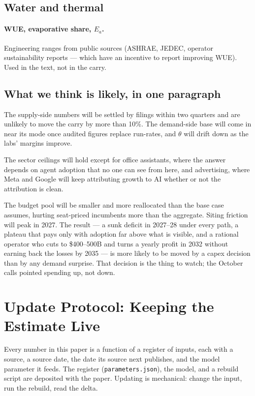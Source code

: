 \documentclass[11pt,letterpaper]{article}
\begin{document}
\subsection*{Water and thermal}
\paragraph{WUE, evaporative share, $E_a$.} Engineering ranges from public sources (ASHRAE, JEDEC, operator sustainability reports --- which have an incentive to report improving WUE). Used in the text, not in the carry.

\subsection*{What we think is likely, in one paragraph}
The supply-side numbers will be settled by filings within two quarters and are unlikely to move the carry by more than 10\%. The demand-side base will come in near its mode once audited figures replace run-rates, and $\theta$ will drift down as the labs' margins improve.

The sector ceilings will hold except for office assistants, where the answer depends on agent adoption that no one can see from here, and advertising, where Meta and Google will keep attributing growth to AI whether or not the attribution is clean.

The budget pool will be smaller and more reallocated than the base case assumes, hurting seat-priced incumbents more than the aggregate. Siting friction will peak in 2027. The result --- a sunk deficit in 2027--28 under every path, a plateau that pays only with adoption far above what is visible, and a rational operator who cuts to \$400--500B and turns a yearly profit in 2032 without earning back the losses by 2035 --- is more likely to be moved by a capex decision than by any demand surprise. That decision is the thing to watch; the October calls pointed spending up, not down.

\section{Update Protocol: Keeping the Estimate Live}\label{app:update}
Every number in this paper is a function of a register of inputs, each with a source, a source date, the date its source next publishes, and the model parameter it feeds. The register (\texttt{parameters.json}), the model, and a rebuild script are deposited with the paper. Updating is mechanical: change the input, run the rebuild, read the delta.
\end{document}
